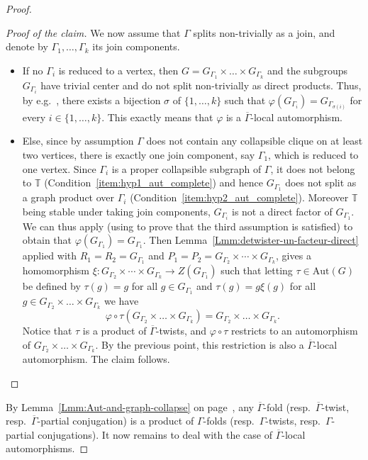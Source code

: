 \documentclass[a4paper,english,11pt]{article}
\theoremstyle{definition}
\theoremstyle{remark}
\newcommand{\Aut}{\mathrm{Aut}}
\begin{document}
\begin{proof}
\begin{proof}[Proof of the claim]
We now assume that $\Gamma$ splits non-trivially as a join, and denote by $\Gamma_1,\dots,\Gamma_k$ its join components.
\begin{itemize}
    \item If no $\Gamma_i$ is reduced to a vertex, then $G=G_{\Gamma_1}\times\dots\times G_{\Gamma_k}$ and the subgroups $G_{\Gamma_i}$ have trivial center and do not split non-trivially as direct products. Thus, by e.g.\ \cite[Lemma~3.5]{Fio}, there exists a bijection $\sigma$ of $\{1,\dots,k\}$ such that $\varphi(G_{\Gamma_i})=G_{\Gamma_{\sigma(i)}}$ for every $i\in\{1,\dots,k\}$. This exactly means that $\varphi$ is a $\overline{\Gamma}$-local automorphism.  
    \item Else, since by assumption $\Gamma$ does not contain any collapsible clique on at least two vertices, there is exactly one join component, say $\Gamma_1$, which is reduced to one vertex. Since $\Gamma_i$ is a proper collapsible subgraph of $\Gamma$, it does not belong to $\mathbb{T}$ (Condition~\ref{item:hyp1_aut_complete})
    and hence $G_{\Gamma_1}$ does not split as a graph product over $\Gamma_i$ (Condition~\ref{item:hyp2_aut_complete}). Moreover $\mathbb{T}$ being stable under taking join components, $G_{\Gamma_i}$ is not a direct factor of $G_{\Gamma_1}$. We can thus apply \cite[Lemma~3.12]{Gen} (using \cite[Lemma~3.5]{Gen} to prove that the third assumption is satisfied) to obtain that $\varphi(G_{\Gamma_1})=G_{\Gamma_1}$. Then Lemma~\ref{Lmm:detwister-un-facteur-direct} applied with $R_1=R_2=G_{\Gamma_1}$ and $P_1=P_2=G_{\Gamma_2}\times \cdots \times G_{\Gamma_k}$, gives a homomorphism ${\xi}:G_{\Gamma_2}\times \cdots \times G_{\Gamma_k}\rightarrow Z(G_{\Gamma_1})$ such that letting $\tau \in \Aut(G)$ be defined by $\tau(g)=g$ for all $g\in G_{\Gamma_1}$ and $\tau(g)=g{\xi}(g)$ for all $g\in G_{\Gamma_2}\times \dots \times G_{\Gamma_k} $ we have
    \begin{equation*}
        \varphi\circ\tau\left(G_{\Gamma_2}\times \dots \times G_{\Gamma_k} \right)=G_{\Gamma_2}\times \dots \times G_{\Gamma_k}.
    \end{equation*}
    Notice that $\tau$ is a product of $\overline{\Gamma}$-twists, and $\varphi\circ\tau$ restricts to an automorphism of $G_{\Gamma_2}\times \dots\times G_{\Gamma_k}$. By the previous point, this restriction is also a $\overline{\Gamma}$-local automorphism. The claim follows. \qedhere
\end{itemize}
\end{proof}

By Lemma~\ref{Lmm:Aut-and-graph-collapse} on page~\pageref{Lmm:Aut-and-graph-collapse}, any $\overline{\Gamma}$-fold (resp.\ $\overline{\Gamma}$-twist, resp.\ $\overline{\Gamma}$-partial conjugation) is a product of $\Gamma$-folds (resp.\ $\Gamma$-twists, resp.\ $\Gamma$-partial conjugations). It now remains to deal with the case of $\overline{\Gamma}$-local automorphisms.


\end{proof}
\end{document}
